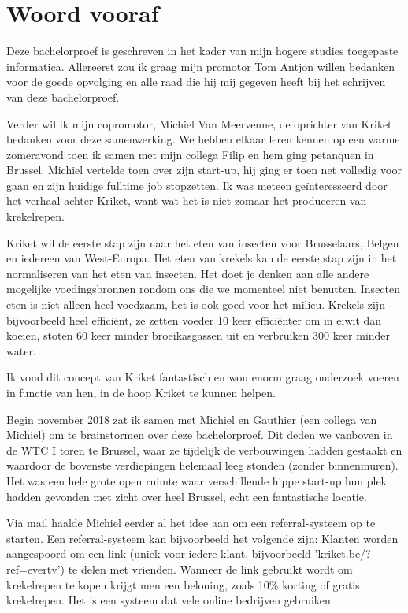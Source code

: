 
\chapter*{Woord vooraf}
\label{ch:voorwoord}

Deze bachelorproef is geschreven in het kader van mijn hogere studies toegepaste informatica. Allereerst zou ik graag mijn promotor Tom Antjon willen bedanken voor de goede opvolging en alle raad die hij mij gegeven heeft bij het schrijven van deze bachelorproef. 

Verder wil ik mijn copromotor, Michiel Van Meervenne, de oprichter van Kriket bedanken voor deze samenwerking. We hebben elkaar leren kennen op een warme zomeravond toen ik samen met mijn collega Filip en hem ging petanquen in Brussel. Michiel vertelde toen over zijn start-up, hij ging er toen net volledig voor gaan en zijn huidige fulltime job stopzetten. Ik was meteen geïnteresseerd door het verhaal achter Kriket, want wat het is niet zomaar het produceren van krekelrepen. 

Kriket wil de eerste stap zijn naar het eten van insecten voor Brusselaars, Belgen en iedereen van West-Europa. Het eten van krekels kan de eerste stap zijn in het normaliseren van het eten van insecten. Het doet je denken aan alle andere mogelijke voedingsbronnen rondom ons die we momenteel niet benutten. Insecten eten is niet alleen heel voedzaam, het is ook goed voor het milieu. Krekels zijn bijvoorbeeld heel efficiënt, ze zetten voeder 10 keer efficiënter om in eiwit dan koeien, stoten 60 keer minder broeikasgassen uit en verbruiken 300 keer minder water. \autocite{Kriket2018}

Ik vond dit concept van Kriket fantastisch en wou enorm graag onderzoek voeren in functie van hen, in de hoop Kriket te kunnen helpen. 

Begin november 2018 zat ik samen met Michiel en Gauthier (een collega van Michiel) om te brainstormen over deze bachelorproef. Dit deden we vanboven in de WTC I toren te Brussel, waar ze tijdelijk de verbouwingen hadden gestaakt en waardoor de bovenste verdiepingen helemaal leeg stonden (zonder binnenmuren). Het was een hele grote open ruimte waar verschillende hippe start-up hun plek hadden gevonden met zicht over heel Brussel, echt een fantastische locatie.

Via mail haalde Michiel eerder al het idee aan om een referral-systeem op te starten. Een referral-systeem kan bijvoorbeeld het volgende zijn: Klanten worden aangespoord om een link (uniek voor iedere klant, bijvoorbeeld 'kriket.be/?ref=evertv') te delen met vrienden. Wanneer de link gebruikt wordt om krekelrepen te kopen krijgt men een beloning, zoals 10\% korting of gratis krekelrepen. Het is een systeem dat vele online bedrijven gebruiken. 


